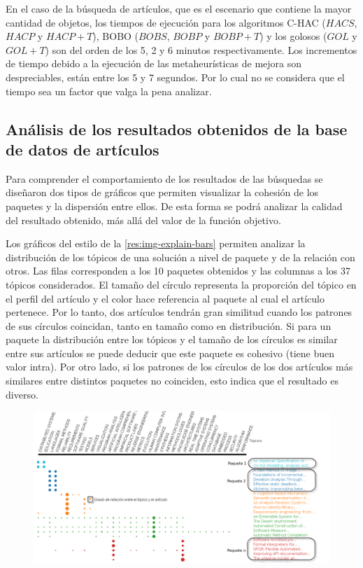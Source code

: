 En el caso de la búsqueda de artículos, que es el escenario que contiene la mayor cantidad de objetos, los tiempos de ejecución para los algoritmos C-HAC ($HACS$, $HACP$ y $HACP+T$), BOBO ($BOBS$, $BOBP$ y $BOBP+T$) y los golosos ($GOL$ y $GOL+T$) son del orden de los 5, 2 y 6 minutos respectivamente. Los incrementos de tiempo debido a la ejecución de las metaheurísticas de mejora son despreciables, están entre los 5 y 7 segundos. Por lo cual no se considera que el tiempo sea un factor que valga la pena analizar.

\subsection{Análisis de los resultados obtenidos de la base de datos de artículos}
Para comprender el comportamiento de los resultados de las búsquedas se diseñaron dos tipos de gráficos que permiten visualizar la cohesión de los paquetes y la dispersión entre ellos. De esta forma se podrá analizar la calidad del resultado obtenido, más allá del valor de la función objetivo.

Los gráficos del estilo de la \autoref{res:img-explain-bars} permiten analizar la distribución de los tópicos de una solución a nivel de paquete y de la relación con otros. Las filas corresponden a los 10 paquetes obtenidos y las columnas a los 37 tópicos considerados. El tamaño del círculo representa la proporción del tópico en el perfil del artículo y el color hace referencia al paquete al cual el artículo pertenece. Por lo tanto, dos artículos tendrán gran similitud cuando los patrones de sus círculos coincidan, tanto en tamaño como en distribución. Si para un paquete la distribución entre los tópicos y el tamaño de los círculos es similar entre sus artículos se puede deducir que este paquete es cohesivo (tiene buen valor intra). Por otro lado, si los patrones de los círculos de los dos artículos más similares entre distintos paquetes no coinciden, esto indica que el resultado es diverso.
\begin{figure}[H]
  \centering
    \includegraphics[width=1\textwidth]{img/explain-bars.png}
  \caption{}
  \label{res:img-explain-bars}
\end{figure}

